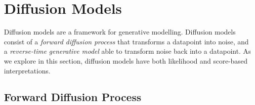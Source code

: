 \documentclass[ oneside,%
                    author={George Herbert},
                    degree={MSci},
                     title={Diffusion Models for Time-Evolving Precipitation Fields},
                  subtitle={}]{dissertation}
\begin{document}
\section{Diffusion Models}
\label{sec:background_diffusion}

Diffusion models \cite{Deep_Unsupervised_Learning_Sohl-Dickstein,DDPM_Ho,Score_Based_Song} are a framework for generative modelling. Diffusion models consist of a \textit{forward diffusion process} that transforms a datapoint into noise, and a \textit{reverse-time generative model} able to transform noise back into a datapoint. As we explore in this section, diffusion models have both likelihood and score-based interpretations.

\subsection{Forward Diffusion Process}
\label{sec:background_diffusion_forward}
\end{document}

